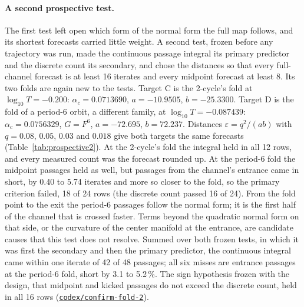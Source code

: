 \documentclass[11pt,letterpaper]{article}
\newcommand{\repourl}{https://github.com/tdj28/neural-shrimp}
\newcommand{\reporef}{arxiv-v1}
\newcommand{\repo}[1]{\href{\repourl/blob/\reporef/#1}{\nolinkurl{#1}}}
\newcommand{\eps}{\varepsilon}
\begin{document}
\paragraph{A second prospective test.} The first test left open which form of the normal form the full map follows,
and its shortest forecasts carried little weight. A second test, frozen before any trajectory was run, made the
continuous passage integral its primary predictor and the discrete count its secondary, and chose the distances so
that every full-channel forecast is at least 16 iterates and every midpoint forecast at least 8. Its two folds are
again new to the tests. Target C is the 2-cycle's fold at $\log_{10}T=-0.200$: $\alpha_c=0.0713690$, $a=-10.9505$, $b=-25.3300$.
Target D is the fold of a period-6 orbit, a different family, at $\log_{10}T=-0.087439$: $\alpha_c=0.0756329$,
$G=F^6$, $a=-72.695$, $b=72.237$. Distances $\eps=q^2/(ab)$ with $q=0.08$, $0.05$, $0.03$ and $0.018$ give both
targets the same forecasts (Table~\ref{tab:prospective2}). At the 2-cycle's fold the integral held in all 12 rows,
and every measured count was the forecast rounded up. At the period-6 fold the midpoint passages held as well, but
passages from the channel's entrance came in short, by 0.40 to 5.74 iterates and more so closer to the fold, so the
primary criterion failed, 18 of 24 rows (the discrete count passed 16 of 24). From the fold point to the exit the
period-6 passages follow the normal form; it is the first half of the channel that is crossed faster. Terms beyond the
quadratic normal form on that side, or the curvature of the center manifold at the entrance, are candidate causes
that this test does not resolve. Summed over both frozen tests, in which it was first the secondary and then the primary predictor, the continuous
integral came within one iterate of 42 of 48 passages; all six misses are entrance passages at the period-6 fold, short by 3.1 to 5.2\,\%. The sign hypothesis
frozen with the design, that midpoint and kicked passages do not exceed the discrete count, held in all 16 rows
(\repo{codex/confirm-fold-2}).
\end{document}
